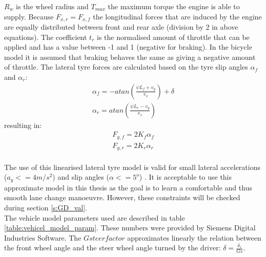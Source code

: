 $R_w$ is the wheel radius and $T_{max}$ the maximum torque the engine is able to supply. Because $F_{x,r} = F_{x, f}$ the longitudinal forces that are induced by the engine are equally distributed between front and rear axle (division by 2 in above equations). The coefficient $t_r$ is the normalised amount of throttle that can be applied and has a value between -1 and 1 (negative for braking). In the bicycle model it is assumed that braking behaves the same as giving a negative amount of throttle.
The lateral tyre forces are calculated based on the tyre slip angles $\alpha_f$ and $\alpha_r$:
\begin{equation}\label{eq:bicycle_slipangle}
\begin{aligned}
\alpha_f = -atan(\frac{\dot{\psi} L_f + v_y}{v_x}) + \delta\\
\alpha_r = atan(\frac{\dot{\psi} L_r - v_y}{v_x})
\end{aligned}
\end{equation}
resulting in:
\begin{equation}\label{eq:bicycle_Fy}
\begin{aligned}
F_{y,f} = 2 K_f \alpha_f\\
F_{y,r} = 2 K_r \alpha_r
\end{aligned}
\end{equation}\\
The use of this linearised lateral tyre model is valid for small lateral accelerations ($a_y <= 4 m/s^2$) and slip angles ($\alpha <= 5^o$) \cite{TongDuySon2019}. It is acceptable to use this approximate model in this thesis as the goal is to learn a comfortable and thus smooth lane change manoeuvre. However, these constraints will be checked during section \ref{s:GD_val}.\\

The vehicle model parameters used are described in table \ref{table:vehicel_model_param}. These numbers were provided by Siemens Digital Industries Software. The $Gsteerfactor$ approximates linearly the relation between the front wheel angle and the steer wheel angle turned by the driver: $\delta = \frac{\delta_s}{Gs}$.  

